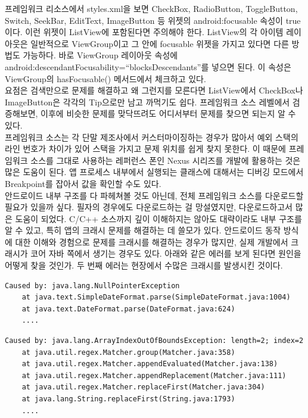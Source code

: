 프레임워크 리소스에서 styles.xml을 보면 CheckBox, RadioButton, ToggleButton, Switch, SeekBar, EditText, ImageButton 등 위젯의 android:focusable 속성이 true이다. 
이런 위젯이 ListView에 포함된다면 주의해야 한다.
ListView의 각 아이템 레이아웃은 일반적으로 ViewGroup이고 그 안에 focusable 위젯을 가지고 있다면 다른 방법도 가능하다. 
바로 ViewGroup 레이아웃 속성에 android:descendantFocusability=``blocksDesc\-endants''를 넣으면 된다. 이 속성은 ViewGroup의 hasFocusable() 메서드에서 체크하고 있다.\\

요점은 검색만으로 문제를 해결하고 왜 그런지를 모른다면 ListView에서 CheckBox나 ImageButton은 각각의 Tip으로만 남고 까먹기도 쉽다. 
프레임워크 소스 레벨에서 검증해보면, 이후에 비슷한 문제를 맞닥뜨려도 어디서부터 문제를 찾으면 되는지 알 수 있다.\\

프레임워크 소스는 각 단말 제조사에서 커스터마이징하는 경우가 많아서 예외 스택의 라인 번호가 차이가 있어 스택을 가지고 문제 위치를 쉽게 찾지 못한다. 
이 때문에 프레임워크 소스를 그대로 사용하는 레퍼런스 폰인 Nexus 시리즈를 개발에 활용하는 것은 많은 도움이 된다. 
앱 프로세스 내부에서 실행되는 클래스에 대해서는 디버깅 모드에서 Breakpoint를 잡아서 값을 확인할 수도 있다.\\

안드로이드 내부 구조를 다 파헤쳐볼 것도 아닌데, 전체 프레임워크 소스를 다운로드할 필요가 있을까 싶다. 
필자의 경우에도 다운로드하는 걸 망설였지만, 다운로드하고서 많은 도움이 되었다. C/C++ 소스까지 깊이 이해하지는 않아도 대략이라도 내부 구조를 알 수 있고, 특히 앱의 크래시 문제를 해결하는 데 쓸모가 있다. 
안드로이드 동작 방식에 대한 이해와 경험으로 문제를 크래시를 해결하는 경우가 많지만, 실제 개발에서 크래시가 코어 자바 쪽에서 생기는 경우도 있다.
아래와 같은 에러를 보게 된다면 원인을 어떻게 찾을 것인가. 두 번째 에러는 현장에서 수많은 크래시를 발생시킨 것이다.
\begin{lstlisting}[frame=single]
Caused by: java.lang.NullPointerException
	at java.text.SimpleDateFormat.parse(SimpleDateFormat.java:1004)
	at java.text.DateFormat.parse(DateFormat.java:624)
	....
\end{lstlisting}

\begin{lstlisting}[frame=single]
Caused by: java.lang.ArrayIndexOutOfBoundsException: length=2; index=2
	at java.util.regex.Matcher.group(Matcher.java:358)
	at java.util.regex.Matcher.appendEvaluated(Matcher.java:138)
	at java.util.regex.Matcher.appendReplacement(Matcher.java:111)
	at java.util.regex.Matcher.replaceFirst(Matcher.java:304)
	at java.lang.String.replaceFirst(String.java:1793)
	....
\end{lstlisting}

